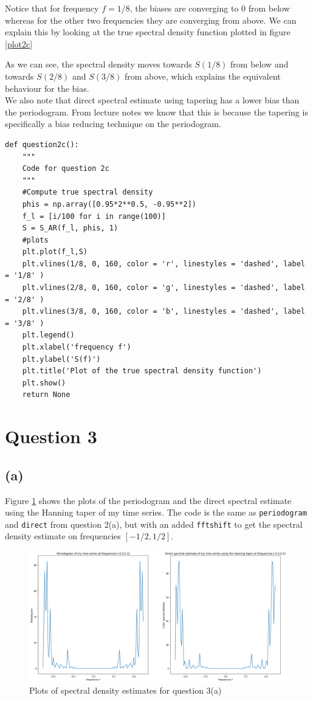\documentclass[a4paper,10pt]{article}
\theoremstyle{mytheor}
\begin{document}
Notice that for frequency $f = 1/8$, the biases are converging to 0 from below whereas for the other two frequencies they are converging from above. We can explain this by looking at the true spectral density function plotted in figure \ref{plot2c}

As we can see, the spectral density moves towards $S(1/8)$ from below and towards $S(2/8)$ and $S(3/8)$ from above, which explains the equivalent behaviour for the bias.\\

We also note that direct spectral estimate using tapering has a lower bias than the periodogram. From lecture notes we know that this is because the tapering is specifically a bias reducing technique on the periodogram.

\begin{lstlisting}
def question2c():
    """
    Code for question 2c
    """
    #Compute true spectral density
    phis = np.array([0.95*2**0.5, -0.95**2])
    f_l = [i/100 for i in range(100)]
    S = S_AR(f_l, phis, 1)
    #plots
    plt.plot(f_l,S)
    plt.vlines(1/8, 0, 160, color = 'r', linestyles = 'dashed', label = '1/8' )
    plt.vlines(2/8, 0, 160, color = 'g', linestyles = 'dashed', label = '2/8' )
    plt.vlines(3/8, 0, 160, color = 'b', linestyles = 'dashed', label = '3/8' )
    plt.legend()
    plt.xlabel('frequency f')
    plt.ylabel('S(f)')
    plt.title('Plot of the true spectral density function')
    plt.show()
    return None
\end{lstlisting}

\section*{Question 3}
\subsection*{(a)}

Figure \ref{plot3a} shows the plots of the periodogram and the direct spectral estimate using the Hanning taper of my time series. The code is the same as \texttt{periodogram} and \texttt{direct} from question 2(a), but with an added \texttt{fftshift} to get the spectral density estimate on frequencies $[-1/2, 1/2]$.

\begin{figure}[b!]
    \centering
    \includegraphics[width=\columnwidth]{plot3a.png}
    \caption{Plots of spectral density estimates for question 3(a)}
    \label{plot3a}
\end{figure}
\end{document}

